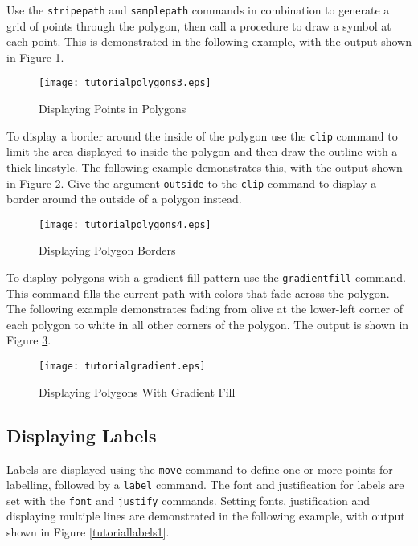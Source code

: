Use the \texttt{stripepath} and \texttt{samplepath}
commands in combination to generate a grid of points through the
polygon, then call a procedure to draw a symbol at each point.
This is demonstrated in the following example, with the output
shown in Figure \ref{tutorialpolygons3}.



\begin{figure}[htb]
\texttt{[image: tutorialpolygons3.eps]}
\caption{Displaying Points in Polygons}
\label{tutorialpolygons3}
\end{figure}

To display a border around the inside of the polygon
use the \texttt{clip}
command to limit the area displayed to inside the polygon
and then draw the outline with a thick linestyle.
The following example demonstrates this, with the output shown
in Figure \ref{tutorialpolygons4}.
Give the argument \texttt{outside}
to the \texttt{clip} command
to display a border around the outside of a polygon instead.



\begin{figure}[htb]
\texttt{[image: tutorialpolygons4.eps]}
\caption{Displaying Polygon Borders}
\label{tutorialpolygons4}
\end{figure}

To display polygons with a gradient fill pattern use
the \texttt{gradientfill} command.
This command fills the current path with colors that fade
across the polygon.
The following example demonstrates fading from olive at the
lower-left corner of each polygon to white in all other corners
of the polygon.  The output is shown in Figure \ref{tutorialgradient}.



\begin{figure}[htb]
\texttt{[image: tutorialgradient.eps]}
\caption{Displaying Polygons With Gradient Fill}
\label{tutorialgradient}
\end{figure}

\subsection{Displaying Labels}

Labels are displayed using the \texttt{move}
command to define one or more points for labelling, followed by a
\texttt{label} command.  The font and justification for labels
are set with the \texttt{font} and \texttt{justify} commands.
Setting fonts, justification and displaying multiple lines
are demonstrated in the following example, with output
shown in Figure \ref{tutoriallabels1}.

